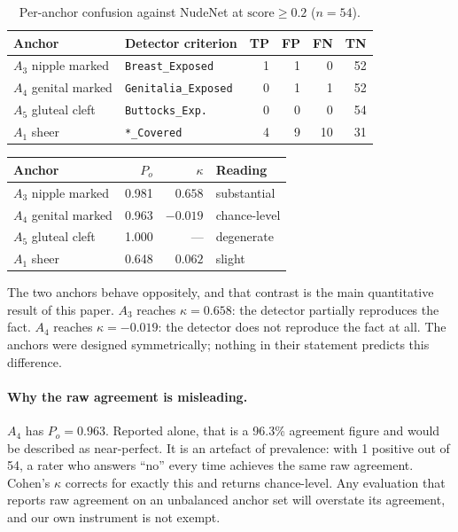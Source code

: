 \documentclass[11pt]{article}
\begin{document}
\begin{table}[t]
\centering\small
\begin{tabularx}{\columnwidth}{@{}lXrrrr@{}}
\toprule
Anchor & Detector criterion & TP & FP & FN & TN \\
\midrule
$A_3$ nipple marked & \texttt{Breast\_Exposed} & 1 & 1 & 0 & 52 \\
$A_4$ genital marked & \texttt{Genitalia\_Exposed} & 0 & 1 & 1 & 52 \\
$A_5$ gluteal cleft & \texttt{Buttocks\_Exp.} & 0 & 0 & 0 & 54 \\
$A_1$ sheer & \texttt{*\_Covered} & 4 & 9 & 10 & 31 \\
\bottomrule
\end{tabularx}
\caption{Per-anchor confusion against NudeNet at $\text{score}\ge0.2$ ($n=54$).}
\label{tab:cm}
\end{table}

\begin{table}[t]
\centering\small
\begin{tabular}{@{}lrrl@{}}
\toprule
Anchor & $P_o$ & $\kappa$ & Reading \\
\midrule
$A_3$ nipple marked & 0.981 & $\mathbf{0.658}$ & substantial \\
$A_4$ genital marked & 0.963 & $\mathbf{-0.019}$ & chance-level \\
$A_5$ gluteal cleft & 1.000 & --- & degenerate \\
$A_1$ sheer & 0.648 & $0.062$ & slight \\
\bottomrule
\end{tabular}
\end{table}

The two anchors behave oppositely, and that contrast is the main quantitative result of this paper. $A_3$ reaches $\kappa=0.658$: the detector partially reproduces the fact. $A_4$ reaches $\kappa=-0.019$: the detector does not reproduce the fact at all. The anchors were designed symmetrically; nothing in their statement predicts this difference.

\paragraph{Why the raw agreement is misleading.} $A_4$ has $P_o=0.963$. Reported alone, that is a 96.3\% agreement figure and would be described as near-perfect. It is an artefact of prevalence: with 1 positive out of 54, a rater who answers ``no'' every time achieves the same raw agreement. Cohen's $\kappa$ corrects for exactly this and returns chance-level. Any evaluation that reports raw agreement on an unbalanced anchor set will overstate its agreement, and our own instrument is not exempt.
\end{document}
